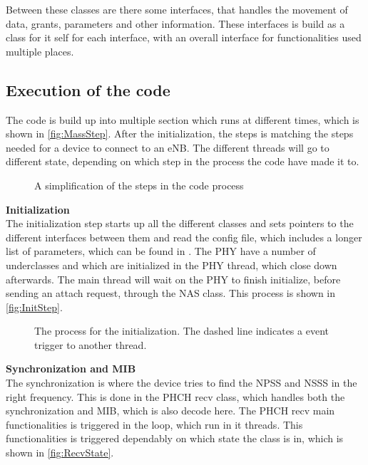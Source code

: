 Between these classes are there some interfaces, that handles the movement of data, grants, parameters and other information. These interfaces is build as a class for it self for each interface, with an overall interface for functionalities used multiple places.

\subsection{Execution of the code}
The code is build up into multiple section which runs at different times, which is shown in \autoref{fig:MassStep}. After the initialization, the steps is matching the steps needed for a device to connect to an eNB. The different threads will go to different state, depending on which step in the process the code have made it to.

\begin{figure}[H]
\centering
{}
\resizebox{0.5\textwidth}{!}{
}
\caption{A simplification of the steps in the code process}
\label{fig:MassStep}
\end{figure}

\textbf{Initialization} \\
The initialization step starts up all the different classes and sets pointers to the different interfaces between them and read the config file, which includes a longer list of parameters, which can be found in . The PHY have a number of underclasses and which are initialized in the PHY thread, which close down afterwards. The main thread will wait on the PHY to finish initialize, before sending an attach request, through the NAS class. This process is shown in \autoref{fig:InitStep}.

\begin{figure}[H]
\centering
{}
\resizebox{0.5\textwidth}{!}{
}
\caption{The process for the initialization. The dashed line indicates a event trigger to another thread.}
\label{fig:InitStep}
\end{figure}


\textbf{Synchronization and MIB} \\
The synchronization is where the device tries to find the NPSS and NSSS in the right frequency. This is done in the PHCH recv class, which handles both the synchronization and MIB, which is also decode here. The PHCH recv main functionalities is triggered in the loop, which run in it threads. This functionalities is triggered dependably on which state the class is in, which is shown in \autoref{fig:RecvState}.

